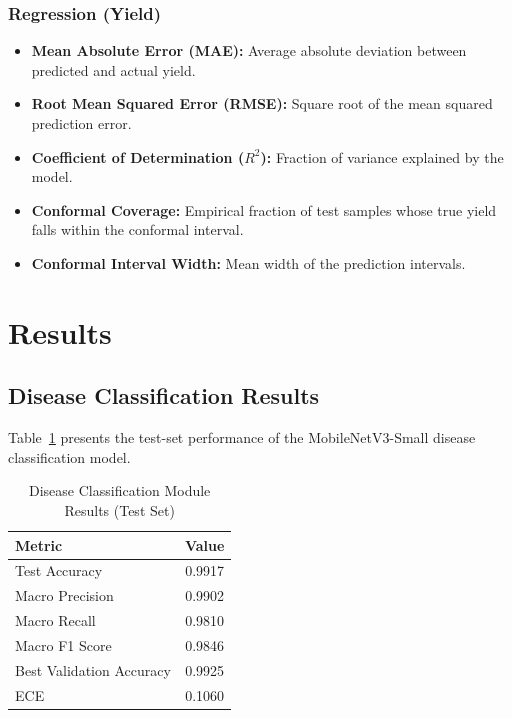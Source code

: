 \documentclass[conference]{IEEEtran}
\begin{document}
\subsubsection{Regression (Yield)}
\begin{itemize}[leftmargin=*]
  \item \textbf{Mean Absolute Error (MAE):} Average absolute deviation between predicted and actual yield.
  \item \textbf{Root Mean Squared Error (RMSE):} Square root of the mean squared prediction error.
  \item \textbf{Coefficient of Determination ($R^{2}$):} Fraction of variance explained by the model.
  \item \textbf{Conformal Coverage:} Empirical fraction of test samples whose true yield falls within the conformal interval.
  \item \textbf{Conformal Interval Width:} Mean width of the prediction intervals.
\end{itemize}


\section{Results}
\label{sec:results}

\subsection{Disease Classification Results}

Table~\ref{tab:disease_results} presents the test-set performance of the MobileNetV3-Small disease classification model.

\begin{table}[htbp]
  \centering
  \caption{Disease Classification Module Results (Test Set)}
  \label{tab:disease_results}
  \begin{tabular}{lc}
    \toprule
    \textbf{Metric} & \textbf{Value} \\
    \midrule
    Test Accuracy           & 0.9917 \\
    Macro Precision         & 0.9902 \\
    Macro Recall            & 0.9810 \\
    Macro F1 Score          & 0.9846 \\
    Best Validation Accuracy & 0.9925 \\
    ECE                     & 0.1060 \\
    \bottomrule
  \end{tabular}
\end{table}
\end{document}
